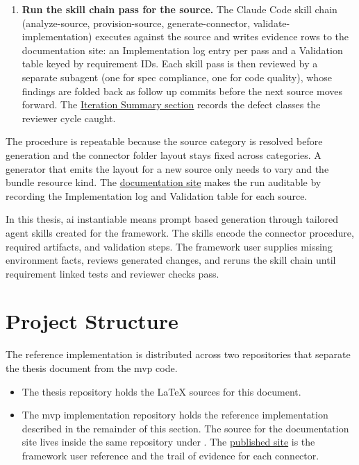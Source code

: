 \begin{enumerate}
    \item \textbf{Run the skill chain pass for the source.} The Claude Code skill chain (analyze-source, provision-source, generate-connector, validate-implementation) executes against the source and writes evidence rows to the documentation site: an Implementation log entry per pass and a Validation table keyed by requirement IDs. Each skill pass is then reviewed by a separate subagent (one for spec compliance, one for code quality), whose findings are folded back as follow up commits before the next source moves forward. The \hyperref[sec:iteration-summary]{Iteration Summary section} records the defect classes the reviewer cycle caught.
\end{enumerate}

The procedure is repeatable because the source category is resolved before generation and the connector folder layout stays fixed across categories. A generator that emits the layout for a new source only needs to vary  and the bundle resource kind. The \href{https://vkraus.github.io/appsec-mvp/}{documentation site} makes the run auditable by recording the Implementation log and Validation table for each source.

In this thesis, \gls{ai} instantiable means prompt based generation through tailored agent skills created for the framework. The skills encode the connector procedure, required artifacts, and validation steps. The framework user supplies missing environment facts, reviews generated changes, and reruns the skill chain until requirement linked tests and reviewer checks pass.

\section{Project Structure}
\label{sec:impl-project-structure}

The reference implementation is distributed across two repositories that separate the thesis document from the \gls{mvp} code.

\begin{itemize}
    \item The thesis repository holds the \LaTeX{} sources for this document.
    \item The \gls{mvp} implementation repository holds the reference implementation described in the remainder of this section. The source for the documentation site lives inside the same repository under . The \href{https://vkraus.github.io/appsec-mvp/}{published site} is the framework user reference and the trail of evidence for each connector.
\end{itemize}

